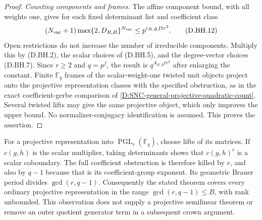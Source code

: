 \begin{proof}
\emph{Counting components and frames.}
The affine component bound, with all weights one, gives
for each fixed determinant list and coefficient class
\[
 (N_{\rm var}+1)\max\{2,D_{R,B}\}^{N_{\rm var}}
                         \le p^{c_{R,B}ftr^2}.          \tag{D.BH.12}
\]
Open restrictions do not increase the number of
irreducible components. Multiply this by (D.BH.2),
the scalar choices of (D.BH.5), and the degree-vector
choices (D.BH.7). Since $r\ge2$ and $q=p^f$, the
result is $q^{A_{R,B}tr^2}$ after enlarging the constant.
Finite $\mathbb F_q$ frames of the scalar-weight-one
twisted unit objects project onto the projective
representation classes with the specified obstruction,
as in the exact coefficient-gerbe comparison of
\ref{D:SNC-general-projective-quadratic-count}.
Several twisted lifts may give the same projective
object, which only improves the upper bound. No
normalizer-conjugacy identification is assumed.
This proves the assertion.
\end{proof}

\begin{remark}
For a projective representation into $\operatorname{PGL}_r(\mathbb F_q)$,
choose lifts of its matrices. If $c(g,h)$ is the scalar multiplier,
taking determinants shows that $c(g,h)^r$ is a scalar coboundary.
The full coefficient obstruction is therefore killed by $r$, and
also by $q-1$ because that is its coefficient-group exponent.
Its geometric Brauer period divides $\gcd(r,q-1)$.
Consequently the stated theorem covers every ordinary projective
representation in the range
$\gcd(r,q-1)\le B$, with rank unbounded. This observation does
not supply a projective semilinear theorem or remove an outer
quotient generator term in a subsequent crown argument.
\end{remark}


